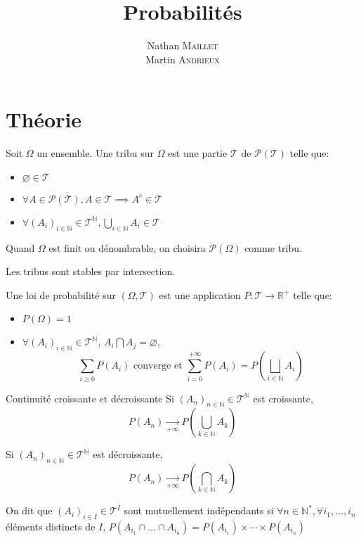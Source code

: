 \documentclass[french, a4paper, 10pt, twocolumn]{article}
\title{Probabilités}
\author{Nathan \textsc{Maillet}\\
  Martin \textsc{Andrieux}}
\date{}
\newcommand{\N}{\mathbb{N}}   %
\newcommand{\R}{\mathbb{R}}   %
\begin{document}
\maketitle

\section{Théorie}
\begin{definition}
  Soit \(\Omega\) un ensemble.
  Une tribu sur \(\Omega\) est une partie \(\mathcal{T}\) de \(\mathcal{P(T)}\) telle que:
  \begin{itemize}
    \item \(\varnothing \in \mathcal{T}\)
    \item \(\forall A \in \mathcal{P(T)}, A \in \mathcal{T} \implies A^c \in  \mathcal{T}\)
    \item \(\forall (A_i)_{i\in \N} \in \mathcal{T}^{\N}, \bigcup_{i\in \N}A_i \in \mathcal{T}\)
  \end{itemize}
  \tcblower
  Quand \(\Omega\) est finit ou dénombrable, on choisira \(\mathcal{P(\Omega)}\) comme tribu.

  Les tribus sont stables par intersection.
\end{definition}

\begin{definition}
  Une loi de probabilité sur $(\Omega,\mathcal{T})$ est une application \(P: \mathcal{T} \rightarrow \R^+\) telle que:
  \begin{itemize}
    \item \(P(\Omega)=1\)
    \item \(\forall {(A_i)}_{i\in \N} \in \mathcal{T}^{\N}\), \(A_i\bigcap A_j =\varnothing\),
      \[\sum_{i\geqslant 0}P(A_i) \text{ converge et } \sum_{i=0}^{+\infty}P(A_i)=P\left(\bigsqcup_{i\in \N}A_i\right)\]
  \end{itemize}
\end{definition}

\begin{theoreme}{Continuité croissante et décroissante}
  Si \({(A_n)}_{n\in \N} \in \mathcal{T}^{\N}\) est croissante, \[P(A_n)\xrightarrow[+\infty]{}P\left(\bigcup_{k\in \N}A_{k}\right)\]

  Si \((A_n)_{n\in \N} \in \mathcal{T}^{\N}\) est décroissante, \[P(A_n)\xrightarrow[+\infty]{}P\left(\bigcap_{k\in \N}A_{k}\right)\]
\end{theoreme}

\begin{definition}
  On dit que \({(A_i)}_{i \in I} \in \mathcal{T}^I\) sont mutuellement indépendants si \(\forall n \in \N^*, \forall i_1,\dots,i_n\)
  éléments distincts de \(I\), \(P(A_{i_1}\cap\dots\cap A_{i_n})=P(A_{i_1})\times\cdots\times P(A_{i_n})\)
\end{definition}
\end{document}
